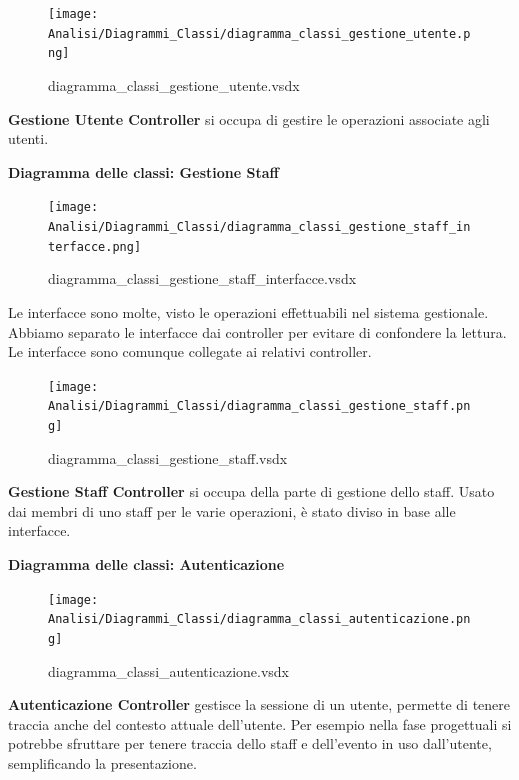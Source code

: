 \documentclass[a4paper]{article}
\begin{document}

\begin{figure}[H]
    \texttt{[image: Analisi/Diagrammi\_Classi/diagramma\_classi\_gestione\_utente.png]}
    \centering
    \caption{diagramma\_classi\_gestione\_utente.vsdx}
\end{figure}

\textbf{Gestione Utente Controller} si occupa di gestire le operazioni associate agli utenti.

\newpage

\textbf{Diagramma delle classi: Gestione Staff}

\begin{figure}[H]
    \texttt{[image: Analisi/Diagrammi\_Classi/diagramma\_classi\_gestione\_staff\_interfacce.png]}
    \centering
    \caption{diagramma\_classi\_gestione\_staff\_interfacce.vsdx}
\end{figure}

Le interfacce sono molte, visto le operazioni effettuabili nel sistema gestionale. Abbiamo separato le interfacce dai controller per evitare di confondere la lettura. Le interfacce sono comunque collegate ai relativi controller.

\begin{figure}[H]
    \texttt{[image: Analisi/Diagrammi\_Classi/diagramma\_classi\_gestione\_staff.png]}
    \centering
    \caption{diagramma\_classi\_gestione\_staff.vsdx}
\end{figure}

\textbf{Gestione Staff Controller} si occupa della parte di gestione dello staff. Usato dai membri di uno staff per le varie operazioni, è stato diviso in base alle interfacce. 


\newpage

\textbf{Diagramma delle classi: Autenticazione}

\begin{figure}[H]
    \texttt{[image: Analisi/Diagrammi\_Classi/diagramma\_classi\_autenticazione.png]}
    \centering
    \caption{diagramma\_classi\_autenticazione.vsdx}
\end{figure}

\textbf{Autenticazione Controller} gestisce la sessione di un utente, permette di tenere traccia anche del contesto attuale dell'utente. Per esempio nella fase progettuali si potrebbe sfruttare per tenere traccia dello staff e dell'evento in uso dall'utente, semplificando la presentazione.
\end{document}
